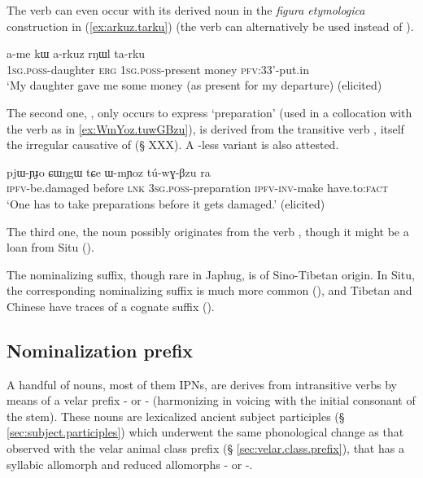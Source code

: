 The verb  can even occur with its derived noun  in the \textit{figura etymologica} construction in (\ref{ex:arkuz.tarku}) (the verb  can alternatively be used instead of ).

\begin{exe}
\ex \label{ex:arkuz.tarku}
\gll a-me kɯ a-rkuz rŋɯl ta-rku \\
\textsc{1sg}.\textsc{poss}-daughter \textsc{erg} \textsc{1sg}.\textsc{poss}-present money \textsc{pfv}:3\fl{}3'-put.in \\
\glt `My daughter gave me some money (as present for my departure) (elicited)
\end{exe}

The second one, , only occurs to express `preparation' (used in a collocation with the verb  as in \ref{ex:WmYoz.tuwGBzu}), is derived from the transitive verb , itself the irregular causative of  (§ XXX). A -less variant  is also attested.

\begin{exe}
\ex \label{ex:WmYoz.tuwGBzu}
\gll  pjɯ-ɲɟo ɕɯŋgɯ tɕe ɯ-mɲoz tú-wɣ-βzu ra \\
\textsc{ipfv}-be.damaged before \textsc{lnk} \textsc{3sg}.\textsc{poss}-preparation \textsc{ipfv}-\textsc{inv}-make have.to:\textsc{fact} \\
\glt `One has to take preparations before it gets damaged.' (elicited)
\end{exe}

The third one, the noun  possibly originates from the verb , though it might be a loan from Situ (\citealt{jacques03s.houzhui}). 

The  nominalizing suffix, though rare in Japhug, is of Sino-Tibetan origin. In Situ, the corresponding nominalizing  suffix is much more common (\citealt{jacques03s.houzhui}), and Tibetan and Chinese have traces of a cognate suffix (\citealt{jacques16ssuffixes}).


\subsection{Nominalization  prefix} \label{sec:G.nmlz}
A handful of nouns, most of them IPNs, are derives from intransitive verbs by means of a velar prefix  - or - (harmonizing in voicing with the initial consonant of the stem). These nouns are lexicalized ancient subject participles (§ \ref{sec:subject.participles}) which underwent the same phonological change as that observed with the velar animal class prefix (§ \ref{sec:velar.class.prefix}), that has a syllabic allomorph  and reduced allomorphs - or -. 

